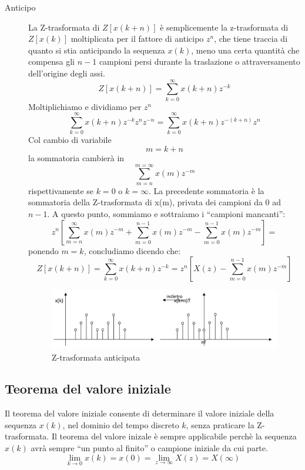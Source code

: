 \documentclass[a4paper]{report}
\begin{document}
\begin{description}
  \item[Anticipo]
    La Z-trasformata di $Z[x(k + n)]$ \`e semplicemente la z-trasformata
    di $Z[x(k)]$ moltiplicata per il fattore di anticipo $z^n$, che
    tiene traccia di quanto si stia anticipando la sequenza $x(k)$, meno una certa
    quantit\`a che compensa gli $n - 1$ campioni persi durante la
    traslazione o attraversamento dell'origine degli assi.
    \[
    Z[x(k + n)] = \sum\limits_{k=0}^{\infty} x(k + n)z^{-k}
    \]
    Moltiplichiamo e dividiamo per $z^n$
    \[
    \sum\limits_{k=0}^{\infty} x(k + n) z^{-k} z^n z^{-n} =
    \sum\limits_{k=0}^{\infty} x(k + n) z^{-(k + n)} z^{n}
    \]
    Col cambio di variabile
    \[
    m = k + n
    \]
    la sommatoria cambier\`a in
    \[
    \sum_{m = n}^{m = \infty} x(m)z^{-m}
    \]
    rispettivamente se $k = 0$ o $k = \infty$.
    La precedente sommatoria \`e la sommatoria della Z-trasformata di
    x(m), privata dei campioni da $0$ ad $n -1$. A questo punto,
    sommiamo e sottraiamo i ``campioni mancanti'':
    \[
    z^n \left[ \sum_{m=n}^{\infty} x(m)z^{-m} + \sum_{m=0}^{n-1} x(m)z^{-m}
    - \sum_{m=0}^{n-1} x(m)z^{-m}\right] = 
    \]
    ponendo $m = k$, concludiamo dicendo che:
    \[
    Z[x(k +n)] = \sum\limits_{k=0}^{\infty} x(k + n)z^{-k} = z^n
    \left[ X(z) - \sum\limits_{m=0}^{n-1} x(m)z^{-m} \right]
    \]
    \begin{figure}[!h]
      \begin{center}
        \includegraphics[scale=0.3]{./figures/discretoAnticipo.png}
        \caption{Z-trasformata
          anticipata}\label{fig:Z-trasformataAnticipo} 
      \end{center}
    \end{figure}
  \end{description}
\subsection{Teorema del valore iniziale}
  Il teorema del valore iniziale consente di determinare il valore
  iniziale della sequenza $x(k)$, nel dominio del tempo discreto $k$,
  senza praticare la Z-trasformata. Il teorema del valore inizale \`e
  sempre applicabile perch\`e la sequenza $x(k)$ avr\`a sempre ``un punto
  al finito'' o campione iniziale da cui parte.
  \begin{equation}\label{eq:teoremaInizialeDiscreto}
    \lim\limits_{k \to 0} x(k) = x(0) = \lim\limits_{z \to \infty}
    X(z) = X(\infty)
  \end{equation}
\end{document}

